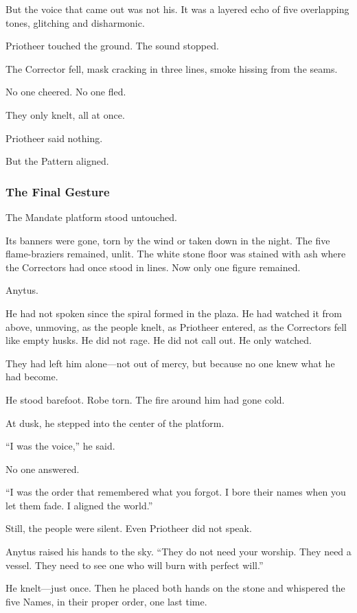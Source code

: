 \documentclass[12pt]{article}
\begin{document}
But the voice that came out was not his. It was a layered echo of five overlapping tones, glitching and disharmonic.

Priotheer touched the ground. The sound stopped.

The Corrector fell, mask cracking in three lines, smoke hissing from the seams.

No one cheered. No one fled.

They only knelt, all at once.

Priotheer said nothing.

But the Pattern aligned.

\dotfill

\subsubsection{The Final Gesture}

The Mandate platform stood untouched.

Its banners were gone, torn by the wind or taken down in the night. The five flame-braziers remained, unlit. The white stone floor was stained with ash where the Correctors had once stood in lines. Now only one figure remained.

Anytus.

He had not spoken since the spiral formed in the plaza. He had watched it from above, unmoving, as the people knelt, as Priotheer entered, as the Correctors fell like empty husks. He did not rage. He did not call out. He only watched.

They had left him alone—not out of mercy, but because no one knew what he had become.

He stood barefoot. Robe torn. The fire around him had gone cold.

At dusk, he stepped into the center of the platform.

“I was the voice,” he said.

No one answered.

“I was the order that remembered what you forgot. I bore their names when you let them fade. I aligned the world.”

Still, the people were silent. Even Priotheer did not speak.

Anytus raised his hands to the sky. “They do not need your worship. They need a vessel. They need to see one who will burn with perfect will.”

He knelt—just once. Then he placed both hands on the stone and whispered the five Names, in their proper order, one last time.
\end{document}
